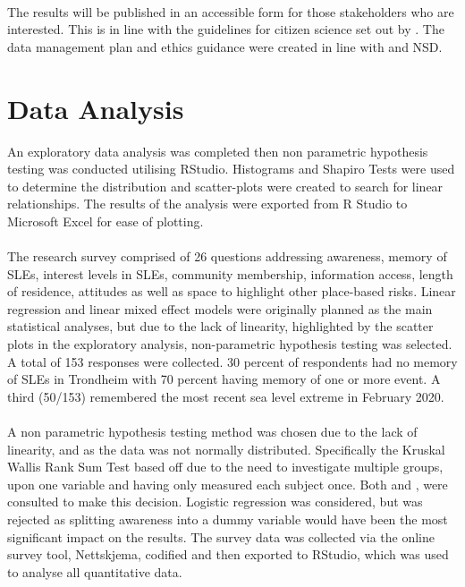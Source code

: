 \paragraph{}
The results will be published in an accessible form for those stakeholders who are interested. This is in line with the guidelines for citizen science set out by \cite{tweddle_guide_2012}. The data management plan and ethics guidance were created in line with \cite{nesh_guidelines_2022} and NSD. 

\section{Data Analysis}
An exploratory data analysis was completed then non parametric hypothesis testing was conducted utilising RStudio. Histograms and Shapiro Tests were used to determine the distribution and scatter-plots were created to search for linear relationships. The results of the analysis were exported from R Studio to Microsoft Excel for ease of plotting.
\paragraph{}
The research survey comprised of 26 questions addressing awareness, memory of SLEs, interest levels in SLEs, community membership, information access, length of residence, attitudes as well as space to highlight other place-based risks. Linear regression and linear mixed effect models were originally planned as the main statistical analyses, but due to the lack of linearity, highlighted by the scatter plots in the exploratory analysis, non-parametric hypothesis testing was selected. A total of 153 responses were collected. 30 percent of respondents had no memory of SLEs in Trondheim with 70 percent having memory of one or more event. A third (50/153) remembered the most recent sea level extreme in February 2020. 
\paragraph{}
A non parametric hypothesis testing method was chosen due to the lack of linearity, and as the data was not normally distributed. Specifically the Kruskal Wallis Rank Sum Test based off \cite{hollander_nonparametric_2014} due to the need to investigate multiple groups, upon one variable and having only measured each subject once. Both \cite{tasman_how_2014} and \cite{hollander_nonparametric_2014}, were consulted to make this decision. Logistic regression was considered, but was rejected as splitting awareness into a dummy variable would have been the most significant impact on the results. The survey data was collected via the online survey tool, Nettskjema, codified and then exported to RStudio, which was used to analyse all quantitative data.
